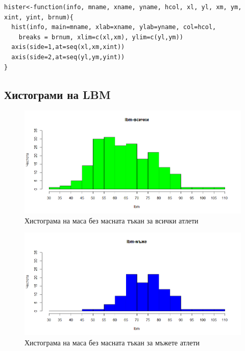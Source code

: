 \documentclass[12pt]{article} %
\begin{document}
\begin{large}
\begin{verbatim}
hister<-function(info, mname, xname, yname, hcol, xl, yl, xm, ym, xint, yint, brnum){
  hist(info, main=mname, xlab=xname, ylab=yname, col=hcol,
   	breaks = brnum, xlim=c(xl,xm), ylim=c(yl,ym))
  axis(side=1,at=seq(xl,xm,xint))
  axis(side=2,at=seq(yl,ym,yint))
}
\end{verbatim}

\clearpage

\subsection{Хистограми на LBM}

\begin{figure}[h!]
\includegraphics[width=\textwidth,height=\textheight,keepaspectratio]{pics/lbmall}
\caption{Хистограма на маса без масната тъкан за всички атлети}
\end{figure}

\begin{figure}[h!]
\includegraphics[width=\textwidth,height=\textheight,keepaspectratio]{pics/lbmmen}
\caption{Хистограма на маса без масната тъкан за мъжете атлети}
\end{figure}


\end{large}
\end{document}
